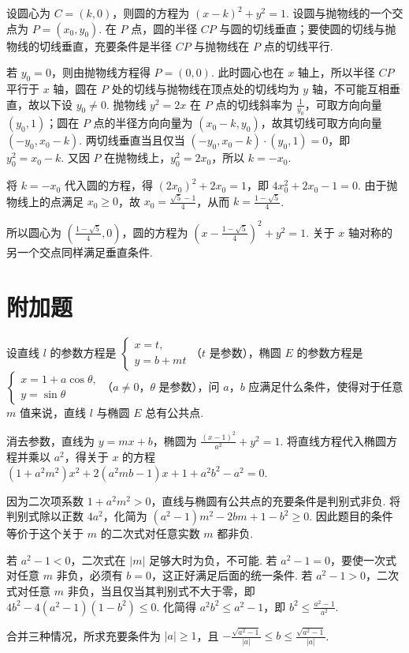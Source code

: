 \begin{solution}
设圆心为 \(C=(k,0)\)，则圆的方程为 \((x-k)^2+y^2=1\). 设圆与抛物线的一个交点为 \(P=(x_0,y_0)\). 在 \(P\) 点，圆的半径 \(CP\) 与圆的切线垂直；要使圆的切线与抛物线的切线垂直，充要条件是半径 \(CP\) 与抛物线在 \(P\) 点的切线平行.

若 \(y_0=0\)，则由抛物线方程得 \(P=(0,0)\). 此时圆心也在 \(x\) 轴上，所以半径 \(CP\) 平行于 \(x\) 轴，圆在 \(P\) 处的切线与抛物线在顶点处的切线均为 \(y\) 轴，不可能互相垂直，故以下设 \(y_0\neq0\). 抛物线 \(y^2=2x\) 在 \(P\) 点的切线斜率为 \(\frac1{y_0}\)，可取方向向量 \((y_0,1)\)；圆在 \(P\) 点的半径方向向量为 \((x_0-k,y_0)\)，故其切线可取方向向量 \((-y_0,x_0-k)\). 两切线垂直当且仅当
\((-y_0,x_0-k)\cdot(y_0,1)=0\)，即 \(y_0^2=x_0-k\). 又因 \(P\) 在抛物线上，\(y_0^2=2x_0\)，所以 \(k=-x_0\).

将 \(k=-x_0\) 代入圆的方程，得 \((2x_0)^2+2x_0=1\)，即 \(4x_0^2+2x_0-1=0\). 由于抛物线上的点满足 \(x_0\geq0\)，故 \(x_0=\frac{\sqrt{5}-1}{4}\)，从而 \(k=\frac{1-\sqrt{5}}{4}\).

所以圆心为 \(\left(\frac{1-\sqrt{5}}{4},0\right)\)，圆的方程为 \(\left(x-\frac{1-\sqrt{5}}{4}\right)^2+y^2=1\). 关于 \(x\) 轴对称的另一个交点同样满足垂直条件.
\end{solution}

\section{附加题}

\begin{problem}
设直线 \(l\) 的参数方程是 \(\begin{cases}
x=t,\\
y=b+mt
\end{cases}\)（\(t\) 是参数），椭圆 \(E\) 的参数方程是 \(\begin{cases}
x=1+a\cos\theta,\\
y=\sin\theta
\end{cases}\)（\(a\neq0\)，\(\theta\) 是参数），问 \(a\)，\(b\) 应满足什么条件，使得对于任意 \(m\) 值来说，直线 \(l\) 与椭圆 \(E\) 总有公共点.
\end{problem}

\begin{solution}
消去参数，直线为 \(y=mx+b\)，椭圆为 \(\frac{(x-1)^2}{a^2}+y^2=1\). 将直线方程代入椭圆方程并乘以 \(a^2\)，得关于 \(x\) 的方程 \((1+a^2m^2)x^2+2(a^2mb-1)x+1+a^2b^2-a^2=0\).

因为二次项系数 \(1+a^2m^2>0\)，直线与椭圆有公共点的充要条件是判别式非负. 将判别式除以正数 \(4a^2\)，化简为 \((a^2-1)m^2-2bm+1-b^2\geq0\). 因此题目的条件等价于这个关于 \(m\) 的二次式对任意实数 \(m\) 都非负.

若 \(a^2-1<0\)，二次式在 \(\lvert m\rvert\) 足够大时为负，不可能. 若 \(a^2-1=0\)，要使一次式对任意 \(m\) 非负，必须有 \(b=0\)，这正好满足后面的统一条件. 若 \(a^2-1>0\)，二次式对任意 \(m\) 非负，当且仅当其判别式不大于零，即 \(4b^2-4(a^2-1)(1-b^2)\leq0\). 化简得 \(a^2b^2\leq a^2-1\)，即 \(b^2\leq\frac{a^2-1}{a^2}\).

合并三种情况，所求充要条件为 \(\lvert a\rvert\geq1\)，且 \(-\frac{\sqrt{a^2-1}}{\lvert a\rvert}\leq b\leq\frac{\sqrt{a^2-1}}{\lvert a\rvert}\).
\end{solution}
